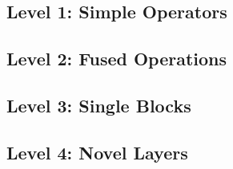 \subsection{Level 1: Simple Operators}
\begin{table}[H]
\centering
\small

\end{table}

\subsection{Level 2: Fused Operations}
\begin{table}[H]
\centering
\small

\end{table}

\subsection{Level 3: Single Blocks}
\begin{table}[H]
\centering
\small

\end{table}

\subsection{Level 4: Novel Layers}
\begin{table}[H]
\centering
\small

\end{table}
